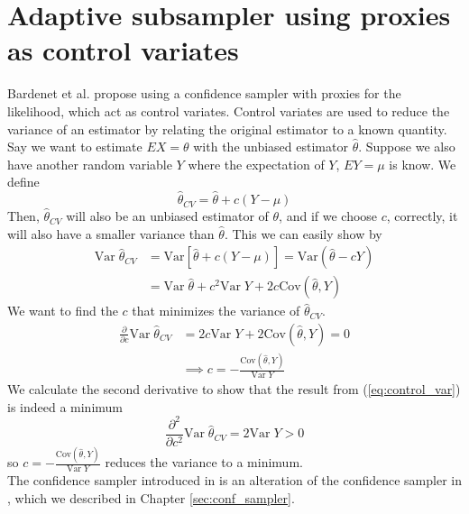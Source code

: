 {\section{Adaptive subsampler using proxies as control variates}\label{sec:adap_subsampl}
Bardenet et al. \cite{Bardenet:1} propose using a confidence sampler with proxies for the likelihood, which act as control variates. 
Control variates are used to reduce the variance of an estimator by relating the original estimator to a known quantity. 
Say we want to estimate $EX = \theta$ with the unbiased estimator $\hat{\theta}$. Suppose we also have another random variable  $Y$ where the expectation of $Y$, $EY = \mu$ is know. 
We define $$\hat{\theta}_{CV} = \hat{\theta} + c\left(Y - \mu\right) $$  Then, $\hat{\theta}_{CV}$ will also be  an unbiased estimator of $\theta$, and if we choose $c$, correctly, it will also have a smaller variance than $\hat{\theta}$. 
This we can easily show by \begin{equation*}
\begin{split}
    \mathrm{Var}\;\hat{\theta}_{CV}  &= \mathrm{Var}\left[\hat{\theta} + c\left(Y - \mu\right)\right]
     = \mathrm{Var}\left(\hat{\theta} - cY\right) \\ & = \mathrm{Var}\;\hat{\theta} + c^2\mathrm{Var}\;Y + 2c\mathrm{Cov}\left(\hat{\theta}, Y\right)
\end{split}
\end{equation*}
We want to find the $c$ that minimizes the variance of $\hat{\theta}_{CV}$. 
\begin{equation}\label{eq:control_var}
\begin{split}
    \frac{\partial}{\partial c} \mathrm{Var}\; \hat{\theta}_{CV} &= 2c\mathrm{Var}\;Y + 2\mathrm{Cov}\left(\hat{\theta}, Y\right) = 0 \\
    & \implies c = - \frac{\mathrm{Cov}\left(\hat{\theta}, Y\right)}{\mathrm{Var}\;Y}
\end{split}
\end{equation}
We calculate the second derivative to show that the result from (\ref{eq:control_var}) is indeed a minimum
\begin{equation*}
    \frac{\partial^2}{\partial c^2} \mathrm{Var}\; \hat{\theta}_{CV}  = 2\mathrm{Var}\; Y > 0 
\end{equation*}
so $c = -\frac{\mathrm{Cov}\left(\hat{\theta}, Y\right)}{\mathrm{Var}\;Y}$ reduces the variance to a minimum. \\
The confidence sampler introduced in \cite{Bardenet:1} is an alteration of the confidence sampler in \cite{Bardenet:2}, which we described in Chapter \ref{sec:conf_sampler}. 
}
